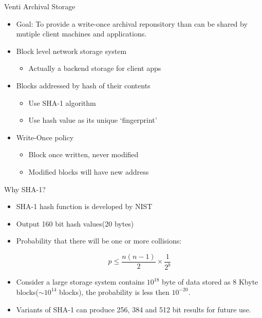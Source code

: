 \begin{frame}{Venti Archival Storage}

\begin{itemize}
\itemsep1pt\parskip0pt
\item
  Goal: To provide a write-once archival reponsitory than can be shared
  by mutiple client machines and applications.
\item
  Block level network storage system

  \begin{itemize}
  \itemsep1pt\parskip0pt
  \item
    Actually a backend storage for client apps
  \end{itemize}
\item
  Blocks addressed by hash of their contents

  \begin{itemize}
  \itemsep1pt\parskip0pt
  \item
    Use SHA-1 algorithm
  \item
    Use hash value as its unique `fingerprint'
  \end{itemize}
\item
  Write-Once policy

  \begin{itemize}
  \itemsep1pt\parskip0pt
  \item
    Block once written, never modified
  \item
    Modified blocks will have new address
  \end{itemize}
\end{itemize}

\end{frame}

\begin{frame}{Why SHA-1?}

\begin{itemize}
\itemsep1pt\parskip0pt
\item
  SHA-1 hash function is developed by NIST
\item
  Output 160 bit hash values(20 bytes)
\item
  Probability that there will be one or more collisions:

  \begin{displaymath}
  p \leq{} \frac{n(n-1)}{2} \times{} \frac{1}{2^b}
  \end{displaymath}
\item
  Consider a large storage system contains \(10^{18}\) byte of data
  stored as 8 Kbyte blocks(\(\sim{}10^{14}\) blocks), the probability is
  less then \(10^{-20}\).
\item
  Variants of SHA-1 can produce 256, 384 and 512 bit results for future
  use.
\end{itemize}

\end{frame}

